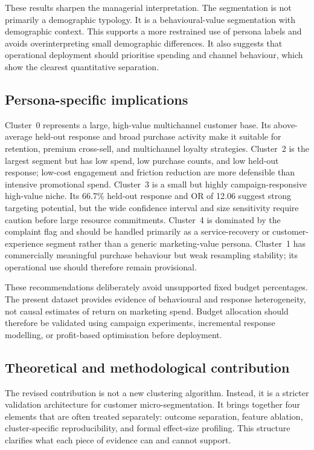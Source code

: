 \documentclass[10pt]{article}
\begin{document}
These results sharpen the managerial interpretation. The segmentation is not primarily a demographic typology. It is a behavioural-value segmentation with demographic context. This supports a more restrained use of persona labels and avoids overinterpreting small demographic differences. It also suggests that operational deployment should prioritise spending and channel behaviour, which show the clearest quantitative separation.

\subsection{Persona-specific implications}
Cluster~0 represents a large, high-value multichannel customer base. Its above-average held-out response and broad purchase activity make it suitable for retention, premium cross-sell, and multichannel loyalty strategies. Cluster~2 is the largest segment but has low spend, low purchase counts, and low held-out response; low-cost engagement and friction reduction are more defensible than intensive promotional spend. Cluster~3 is a small but highly campaign-responsive high-value niche. Its 66.7\% held-out response and OR of 12.06 suggest strong targeting potential, but the wide confidence interval and size sensitivity require caution before large resource commitments. Cluster~4 is dominated by the complaint flag and should be handled primarily as a service-recovery or customer-experience segment rather than a generic marketing-value persona. Cluster~1 has commercially meaningful purchase behaviour but weak resampling stability; its operational use should therefore remain provisional.

These recommendations deliberately avoid unsupported fixed budget percentages. The present dataset provides evidence of behavioural and response heterogeneity, not causal estimates of return on marketing spend. Budget allocation should therefore be validated using campaign experiments, incremental response modelling, or profit-based optimisation before deployment.

\subsection{Theoretical and methodological contribution}
The revised contribution is not a new clustering algorithm. Instead, it is a stricter validation architecture for customer micro-segmentation. It brings together four elements that are often treated separately: outcome separation, feature ablation, cluster-specific reproducibility, and formal effect-size profiling. This structure clarifies what each piece of evidence can and cannot support.
\end{document}
